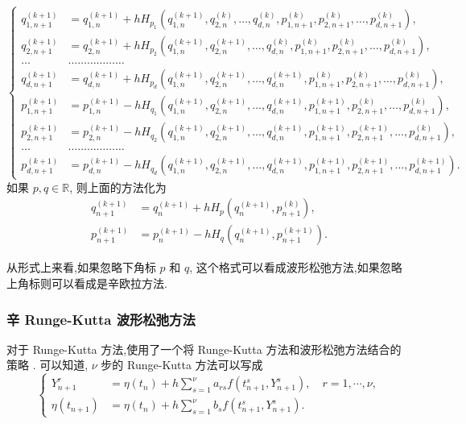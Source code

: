 \begin{equation*}
  \left\{
    \begin{aligned}
      q_{1,n+1}^{(k+1)}&=q_{1,n}^{(k+1)}+hH_{p_{1}}(q_{1,n}^{(k+1)},q_{2,n}^{(k)},\ldots,q_{d,n}^{(k)},p_{1,n+1}^{(k)},p_{2,n+1}^{(k)},\ldots,p_{d,n+1}^{(k)}),\\
      q_{2,n+1}^{(k+1)}&=q_{2,n}^{(k+1)}+hH_{p_{2}}(q_{1,n}^{(k+1)},q_{2,n}^{(k+1)},\ldots,q_{d,n}^{(k)},p_{1,n+1}^{(k)},p_{2,n+1}^{(k)},\ldots,p_{d,n+1}^{(k)}),\\
      \ldots&\ldots\ldots\ldots\ldots\ldots\ldots\\
      q_{d,n+1}^{(k+1)}&=q_{d,n}^{(k+1)}+hH_{p_{d}}(q_{1,n}^{(k+1)},q_{2,n}^{(k+1)},\ldots,q_{d,n}^{(k+1)},p_{1,n+1}^{(k)},p_{2,n+1}^{(k)},\ldots,p_{d,n+1}^{(k)}),\\
      p_{1,n+1}^{(k+1)}&=p_{1,n}^{(k+1)}-hH_{q_{1}}(q_{1,n}^{(k+1)},q_{2,n}^{(k+1)},\ldots,q_{d,n}^{(k+1)},p_{1,n+1}^{(k+1)},p_{2,n+1}^{(k)},\ldots,p_{d,n+1}^{(k)}),\\
      p_{2,n+1}^{(k+1)}&=p_{2,n}^{(k+1)}-hH_{q_{2}}(q_{1,n}^{(k+1)},q_{2,n}^{(k+1)},\ldots,q_{d,n}^{(k+1)},p_{1,n+1}^{(k+1)},p_{2,n+1}^{(k+1)},\ldots,p_{d,n+1}^{(k)}),\\
      \ldots&\ldots\ldots\ldots\ldots\ldots\ldots\\
      p_{d,n+1}^{(k+1)}&=p_{d,n}^{(k+1)}-hH_{q_{d}}(q_{1,n}^{(k+1)},q_{2,n}^{(k+1)},\ldots,q_{d,n}^{(k+1)},p_{1,n+1}^{(k+1)},p_{2,n+1}^{(k+1)},\ldots,p_{d,n+1}^{(k+1)}).
    \end{aligned}
  \right.
\end{equation*}
如果 $p,q \in \mathbb{R}$, 则上面的方法化为
\begin{equation}\label{eq:schemegauss}
  \begin{aligned}
    q_{n+1}^{(k+1)}&=q_{n}^{(k+1)}+hH_{p}(q_{n}^{(k+1)},p_{n+1}^{(k)}),\\
    p_{n+1}^{(k+1)}&=p_{n}^{(k+1)}-hH_{q}(q_{n}^{(k+1)},p_{n+1}^{(k+1)}).
  \end{aligned}
\end{equation}

从形式上来看,如果忽略下角标 $p$ 和 $q$, 这个格式可以看成波形松弛方法,如果忽略上角标则可以看成是辛欧拉方法.

\subsubsection{辛 Runge-Kutta 波形松弛方法}
对于 Runge-Kutta 方法,使用了一个将 Runge-Kutta 方法和波形松弛方法结合的策略 \cite{bellen1993use,bellen1994contractivity}. 可以知道, $\nu$ 步的 Runge-Kutta 方法可以写成
\begin{equation*}
  \left\lbrace
    \begin{aligned}
      Y_{n+1}^{r}&=\eta(t_{n})+h\sum_{s=1}^{\nu}a_{rs}f(t_{n+1}^{s},Y_{n+1}^{s}),\quad r=1,\cdots, \nu, \\
      \eta(t_{n+1})&=\eta(t_{n})+h\sum_{s=1}^{\nu}b_{s}f(t_{n+1}^{s},Y_{n+1}^{s}).
    \end{aligned}
  \right.
\end{equation*}

